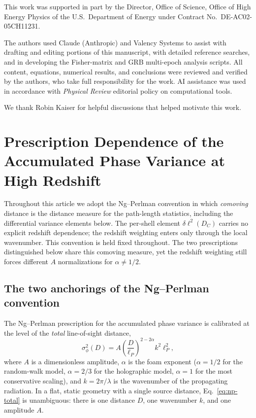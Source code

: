 \documentclass[aps,prd,onecolumn,amsmath,amssymb]{revtex4-2}
\begin{document}
\begin{acknowledgments}
This work was supported in part by the Director, Office of Science, Office of
High Energy Physics of the U.S.\ Department of Energy under Contract No.\
DE-AC02-05CH11231.

The authors used Claude (Anthropic) and Valency Systems to assist with drafting and editing portions of this manuscript, with detailed reference searches, and in developing the Fisher-matrix and GRB multi-epoch analysis scripts. All content, equations, numerical results, and conclusions were reviewed and verified by the authors, who take full responsibility for the work.  AI assistance was used in accordance with \textit{Physical Review} editorial policy on computational tools.

We thank Robin Kaiser for helpful discussions that helped motivate this work.
\end{acknowledgments}



\appendix

\section{Prescription Dependence of the Accumulated Phase Variance at High Redshift}
\label{app:prescription}

Throughout this article we adopt the Ng--Perlman convention in which
\emph{comoving} distance is the distance measure for the path-length
statistics, including the differential variance elements below. The per-shell
element $\delta\ell^2(D_C)$ carries no explicit redshift dependence; the
redshift weighting enters only through the local wavenumber. This convention is
held fixed throughout. The two prescriptions distinguished below share this
comoving measure, yet the redshift weighting still forces different $A$
normalizations for $\alpha\neq1/2$.

\subsection{The two anchorings of the Ng--Perlman convention}

The Ng--Perlman prescription for the accumulated phase variance is calibrated
at the level of the \emph{total} line-of-sight distance,
\begin{equation}
  \sigma_\phi^2(D)
  = A\left(\frac{D}{\ell_P}\right)^{2-2\alpha} k^2 \ell_P^2 ,
  \label{eq:np-total}
\end{equation}
where $A$ is a dimensionless amplitude, $\alpha$ is the foam exponent
($\alpha=1/2$ for the random-walk model, $\alpha=2/3$ for the holographic
model, $\alpha=1$ for the most conservative scaling), and $k=2\pi/\lambda$ is
the wavenumber of the propagating radiation. In a flat, static geometry with a
single source distance, Eq.~\eqref{eq:np-total} is unambiguous: there is one
distance $D$, one wavenumber $k$, and one amplitude $A$.
\end{document}
